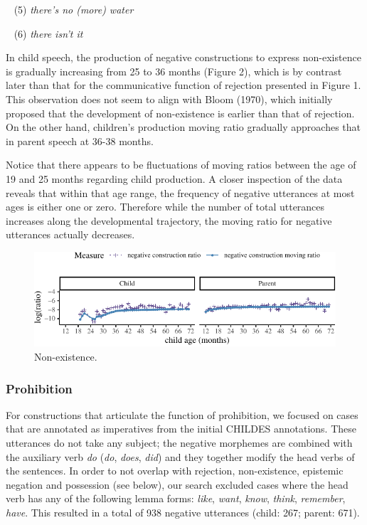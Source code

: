 \documentclass[10pt, letterpaper]{article}
\newenvironment{CodeChunk}{}{}
\begin{document}
~ (5) \emph{there's no (more) water}

~ (6) \emph{there isn't it}

In child speech, the production of negative constructions to express
non-existence is gradually increasing from 25 to 36 months (Figure 2),
which is by contrast later than that for the communicative function of
rejection presented in Figure 1. This observation does not seem to align
with Bloom (1970), which initially proposed that the development of
non-existence is earlier than that of rejection. On the other hand,
children's production moving ratio gradually approaches that in parent
speech at 36-38 months.

Notice that there appears to be fluctuations of moving ratios between
the age of 19 and 25 months regarding child production. A closer
inspection of the data reveals that within that age range, the frequency
of negative utterances at most ages is either one or zero. Therefore
while the number of total utterances increases along the developmental
trajectory, the moving ratio for negative utterances actually decreases.

\begin{figure}[h]

\begin{CodeChunk}


\begin{center}\includegraphics{figs/existence-1} \end{center}

\end{CodeChunk}
\caption[This image spans both columns]{Non-existence.}\label{fig:non-existence}
\end{figure}

\hypertarget{prohibition}{%
\subsubsection{Prohibition}\label{prohibition}}

For constructions that articulate the function of prohibition, we
focused on cases that are annotated as imperatives from the initial
CHILDES annotations. These utterances do not take any subject; the
negative morphemes are combined with the auxiliary verb \emph{do}
(\emph{do}, \emph{does}, \emph{did}) and they together modify the head
verbs of the sentences. In order to not overlap with rejection,
non-existence, epistemic negation and possession (see below), our search
excluded cases where the head verb has any of the following lemma forms:
\emph{like}, \emph{want}, \emph{know}, \emph{think}, \emph{remember},
\emph{have}. This resulted in a total of 938 negative utterances (child:
267; parent: 671).
\end{document}
